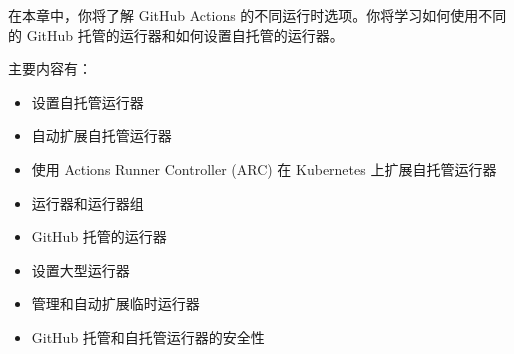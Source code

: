 在本章中，你将了解 GitHub Actions 的不同运行时选项。你将学习如何使用不同的 GitHub 托管的运行器和如何设置自托管的运行器。

主要内容有：

\begin{itemize}
\item 
设置自托管运行器

\item 
自动扩展自托管运行器

\item 
使用 Actions Runner Controller (ARC) 在 Kubernetes 上扩展自托管运行器

\item 
运行器和运行器组

\item 
GitHub 托管的运行器

\item 
设置大型运行器

\item 
管理和自动扩展临时运行器

\item 
GitHub 托管和自托管运行器的安全性
\end{itemize}